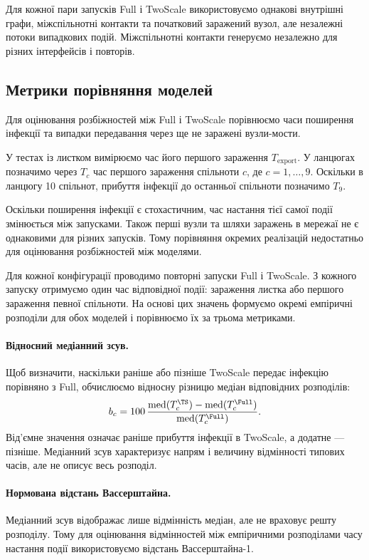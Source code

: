 Для кожної пари запусків Full і TwoScale
використовуємо однакові внутрішні графи,
міжспільнотні контакти та початковий
заражений вузол, але незалежні потоки
випадкових подій. Міжспільнотні контакти
генеруємо незалежно для різних інтерфейсів
і повторів.





\subsection{Метрики порівняння моделей}

Для оцінювання розбіжностей між Full і TwoScale
порівнюємо часи поширення інфекції та випадки
передавання через ще не заражені вузли-мости.

У тестах із листком вимірюємо час його першого
зараження $T_{\mathrm{export}}$.
У ланцюгах позначимо через $T_c$ час першого
зараження спільноти $c$, де $c=1,\ldots,9$.
Оскільки в ланцюгу 10 спільнот, прибуття інфекції до останньої спільноти
позначимо $T_9$.

Оскільки поширення інфекції є стохастичним,
час настання тієї самої події змінюється
між запусками.  Також перші вузли та шляхи заражень в мережаї не є однаковими для різних запусків. Тому порівняння окремих
реалізацій недостатньо для оцінювання
розбіжностей між моделями.

Для кожної конфігурації проводимо повторні
запуски Full і TwoScale. З кожного запуску
отримуємо один час відповідної події:
зараження листка або першого зараження
певної спільноти. На основі цих значень
формуємо окремі емпіричні розподіли
для обох моделей і порівнюємо їх
за трьома метриками.



\paragraph{Відносний медіанний зсув.}
Щоб визначити, наскільки раніше або пізніше
TwoScale передає інфекцію порівняно з Full,
обчислюємо відносну різницю медіан
відповідних розподілів:
\[
b_c =
100\,
\frac{
\operatorname{med}(T_c^{\TS})-
\operatorname{med}(T_c^{\Full})
}{
\operatorname{med}(T_c^{\Full})
}.
\]
Від'ємне значення означає раніше прибуття
інфекції в TwoScale, а додатне --- пізніше.
Медіанний зсув характеризує напрям
і величину відмінності типових часів,
але не описує весь розподіл.

\paragraph{Нормована відстань Вассерштайна.}
Медіанний зсув відображає лише відмінність
медіан, але не враховує решту розподілу.
Тому для оцінювання відмінностей між
емпіричними розподілами часу настання
події використовуємо відстань
Вассерштайна-1.

